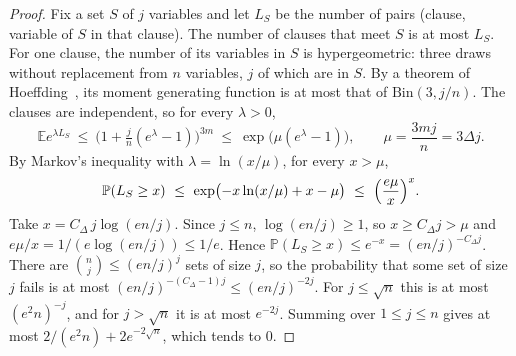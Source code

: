 \documentclass[11pt,a4paper]{article}
\theoremstyle{definition}
\theoremstyle{remark}
\newcommand{\E}{\mathbb{E}}
\newcommand{\PP}{\mathbb{P}}
\begin{document}
\begin{proof}
Fix a set $S$ of $j$ variables and let $L_S$ be the number of pairs (clause, variable of $S$
in that clause). The number of clauses that meet $S$ is at most $L_S$. For one clause, the
number of its variables in $S$ is hypergeometric: three draws without replacement from $n$
variables, $j$ of which are in $S$. By a theorem of Hoeffding~\cite[Theorem~4]{Hoe63}, its
moment generating function is at most that of $\mathrm{Bin}(3,j/n)$. The clauses are
independent, so for every $\lambda>0$,
\[
\E e^{\lambda L_S}\ \le\ \bigl(1+\tfrac jn(e^\lambda-1)\bigr)^{3m}\ \le\ \exp\bigl(\mu(e^\lambda-1)\bigr),
\qquad \mu=\frac{3mj}{n}=3\Delta j .
\]
By Markov's inequality with $\lambda=\ln(x/\mu)$, for every $x>\mu$,
\[
\PP(L_S\ge x)\ \le\ \exp\bigl(-x\ln(x/\mu)+x-\mu\bigr)\ \le\ \Bigl(\frac{e\mu}{x}\Bigr)^{x}.
\]
Take $x=C_\Delta\,j\log(en/j)$. Since $j\le n$, $\log(en/j)\ge1$, so $x\ge C_\Delta j>\mu$ and
$e\mu/x=1/(e\log(en/j))\le1/e$. Hence
$\PP(L_S\ge x)\le e^{-x}=(en/j)^{-C_\Delta j}$. There are $\binom nj\le(en/j)^j$ sets of size
$j$, so the probability that some set of size $j$ fails is at most
$(en/j)^{-(C_\Delta-1)j}\le(en/j)^{-2j}$. For $j\le\sqrt n$ this is at most $(e^2n)^{-j}$, and
for $j>\sqrt n$ it is at most $e^{-2j}$. Summing over $1\le j\le n$ gives at most
$2/(e^2n)+2e^{-2\sqrt n}$, which tends to $0$.
\end{proof}
\end{document}
